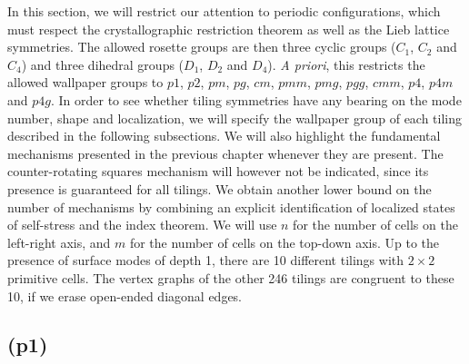 	In this section, we will restrict our attention to periodic configurations, which must respect the crystallographic restriction theorem as well as the Lieb lattice symmetries. The allowed rosette groups are then three cyclic groups ($C_1$, $C_2$ and $C_4$) and three dihedral groups ($D_1$, $D_2$ and $D_4$). \textit{A priori}, this restricts the allowed wallpaper groups to $p1$, $p2$, $pm$, $pg$, $cm$, $pmm$, $pmg$, $pgg$, $cmm$, $p4$, $p4m$ and $p4g$. In order to see whether tiling symmetries have any bearing on the mode number, shape and localization, we will specify the wallpaper group of each tiling described in the following subsections. We will also highlight the fundamental mechanisms presented in the previous chapter whenever they are present. The counter-rotating squares mechanism will however not be indicated, since its presence is guaranteed for all tilings. We obtain another lower bound on the number of mechanisms by combining an explicit identification of localized states of self-stress and the index theorem. We will use $n$ for the number of cells on the left-right axis, and $m$ for the number of cells on the top-down axis. Up to the presence of surface modes of depth 1, there are 10 different tilings with $2\times2$ primitive cells. The vertex graphs of the other 246 tilings are congruent to these 10, if we erase open-ended diagonal edges.
	
\subsection{(p1)}
\label{sec:p1}

